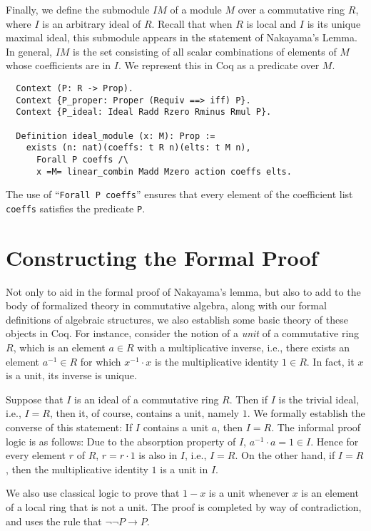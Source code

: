 \documentclass[referee,sn-mathphys]{sn-jnl}
\theoremstyle{definition}
\theoremstyle{remark}
\numberwithin{equation}{section}
\numberwithin{figure}{subsection}
\begin{document}
Finally, we define the submodule $IM$ of a module $M$ over a commutative ring $R$, 
where $I$ is an arbitrary ideal of $R$.
Recall that when $R$ is local and $I$ is its unique maximal ideal, this submodule 
appears in the statement of Nakayama's Lemma. 
In general, $IM$ is the set consisting of all scalar
combinations of elements of \(M\) whose coefficients are in  \(I\). We
represent this in Coq as a predicate over \(M\).

\begin{verbatim}
  Context (P: R -> Prop).
  Context {P_proper: Proper (Requiv ==> iff) P}.
  Context {P_ideal: Ideal Radd Rzero Rminus Rmul P}.
  
  Definition ideal_module (x: M): Prop :=
    exists (n: nat)(coeffs: t R n)(elts: t M n),
      Forall P coeffs /\
      x =M= linear_combin Madd Mzero action coeffs elts.
\end{verbatim}

\noindent The use of  ``\verb|Forall P coeffs|'' ensures that every element of the
coefficient list \texttt{coeffs} satisfies the predicate \texttt{P}.  

\section{Constructing the Formal Proof} \label{formal-proof: S}
Not only to aid in the formal proof of Nakayama's lemma, but also to add to the body 
of formalized theory in commutative algebra, along with our formal definitions of algebraic structures,
we also  
 establish some basic theory of these objects in Coq.
 For instance, 
consider the notion of a \emph{unit} of a
commutative ring $R$, which is an element $a \in R$ with a multiplicative inverse,
i.e., there exists an element $a^{-1} \in R$ for which $x^{-1} \cdot x$ is the
multiplicative identity $1 \in R$.  In fact, it $x$ is a unit, its inverse is unique.

Suppose that $I$ is an ideal of a commutative ring $R$.   Then if $I$ is the trivial ideal, i.e., $I = R$, then it, of course, contains a unit, namely $1$. 
We formally establish the converse of this statement: If $I$ contains a
unit $a$, then $I=R$. 
The informal proof logic is as follows:  Due to the absorption property of $I$,  
$a^{-1}  \cdot a= 1 \in I$.  Hence for every element $r$ of $R$,
$r = r \cdot 1$ is also in $I$, i.e., $I=R$. 
On the other hand, if $I = R$, then the multiplicative identity $1$ is a unit in $I$.  


We also use classical logic to prove that \(1 - x\) is a unit whenever \(x\)
is an element of a local ring that is not a unit. The proof is completed by way
of contradiction, and uses the rule that \(\neg\neg P\rightarrow P\).
\end{document}
